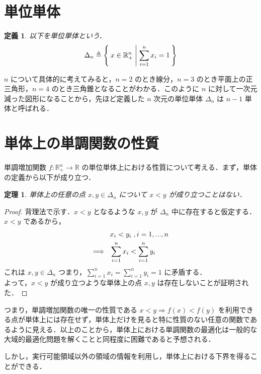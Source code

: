 \documentclass[a4paper,11pt]{jreport}
\newtheorem{definition}{定義}
\newtheorem{theorem}{定理}
\begin{document}
\section{単位単体}

\begin{definition}
以下を単位単体という．
$$ \Delta_n \triangleq \Set{ x \in \mathbb{R}^n_{+} | \sum_{i=1}^{n} x_i = 1 } $$
\end{definition}

$ n $ について具体的に考えてみると，$ n=2 $ のとき線分，$ n=3 $ のとき平面上の正三角形，$ n=4 $ のとき三角錐となることがわかる．このように $n$ に対して一次元減った図形になることから，先ほど定義した $n$ 次元の単位単体 $ \Delta_n $ は $ n-1 $ 単体と呼ばれる．\par

\section{単体上の単調関数の性質}

単調増加関数 $ f : \mathbb{R}^n_{+} \to \mathbb{R} $ の単位単体上における性質について考える．まず，単体の定義から以下が成り立つ．\\

\begin{theorem}
単体上の任意の点 $ x, y \in \Delta_n $ について $ x < y $ が成り立つことはない．
\end{theorem}

\begin{proof}
背理法で示す．$ x < y $ となるような $ x, y $ が $ \Delta_n $ 中に存在すると仮定する．\\
$ x < y $ であるから，
\begin{align}
& x_i < y_i \;, i = 1, ..., n \notag \\
\Longrightarrow \hspace{8pt} & \sum_{i=1}^n x_i < \sum_{i=1}^n y_i \notag
\end{align}
これは $ x, y \in \Delta_n $ つまり，$ \sum_{i=1}^n x_i = \sum_{i=1}^n y_i = 1 $ に矛盾する．\\
よって，$ x < y $ が成り立つような単体上の点 $ x, y $ は存在しないことが証明された．
\end{proof}

つまり，単調増加関数の唯一の性質である $ x < y \Rightarrow f(x) < f(y) $ を利用できる点が単体上には存在せず，単体上だけを見ると特に性質のない任意の関数であるように見える．以上のことから，単体上における単調関数の最適化は一般的な大域的最適化問題を解くことと同程度に困難であると予想される．\par
しかし，実行可能領域以外の領域の情報を利用し，単体上における下界を得ることができる．\\
\end{document}
